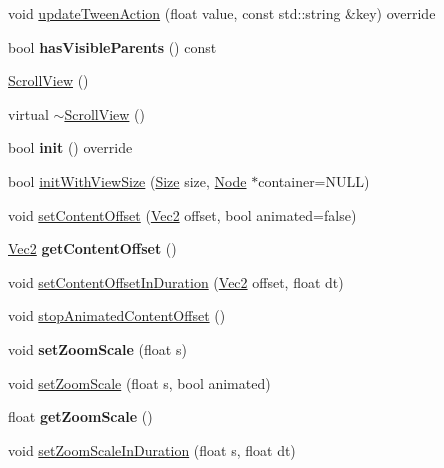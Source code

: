 \begin{DoxyCompactItemize}
\item 
void \hyperlink{classScrollView_a0af7498e959826dad2ae4d66f1b5b71d}{update\+Tween\+Action} (float value, const std\+::string \&key) override
\item 
\mbox{\label{classScrollView_a40274c1a8232b918781bdc04fe90c51d}} 
bool {\bfseries has\+Visible\+Parents} () const
\item 
\hyperlink{classScrollView_afe9273a62ee4829f87d13a22e0576ac7}{Scroll\+View} ()
\item 
virtual \hyperlink{classScrollView_a0bacfb202cd2daa890445aeb544fd17e}{$\sim$\+Scroll\+View} ()
\item 
\mbox{\label{classScrollView_a816fd4b60480d60ff4704e88299c40e9}} 
bool {\bfseries init} () override
\item 
bool \hyperlink{classScrollView_ae672005fc1d0d8dd3605d85e9f41a1d4}{init\+With\+View\+Size} (\hyperlink{classSize}{Size} size, \hyperlink{classNode}{Node} $\ast$container=N\+U\+LL)
\item 
void \hyperlink{classScrollView_ab8bc90e2fef0ba2e8ddf04778bb44dfe}{set\+Content\+Offset} (\hyperlink{classVec2}{Vec2} offset, bool animated=false)
\item 
\mbox{\label{classScrollView_ad5f0dcac1ccec63afe1c2dab0aea34c5}} 
\hyperlink{classVec2}{Vec2} {\bfseries get\+Content\+Offset} ()
\item 
void \hyperlink{classScrollView_ad98397d42075b810de17c35eb9843ec7}{set\+Content\+Offset\+In\+Duration} (\hyperlink{classVec2}{Vec2} offset, float dt)
\item 
void \hyperlink{classScrollView_a13c84492be7e7c8e06a29f6bd3bdcc7e}{stop\+Animated\+Content\+Offset} ()
\item 
\mbox{\label{classScrollView_a6e3020ab1ab0e1b59476753e2bdda04b}} 
void {\bfseries set\+Zoom\+Scale} (float s)
\item 
void \hyperlink{classScrollView_a9c9101d58eeb922bfe64b9b4cd01b314}{set\+Zoom\+Scale} (float s, bool animated)
\item 
\mbox{\label{classScrollView_a03153f8bab88f3fb4dc1176b7b018035}} 
float {\bfseries get\+Zoom\+Scale} ()
\item 
void \hyperlink{classScrollView_a04c9d8527dc9a0b883324c90d5b30ae2}{set\+Zoom\+Scale\+In\+Duration} (float s, float dt)

\end{DoxyCompactItemize}
